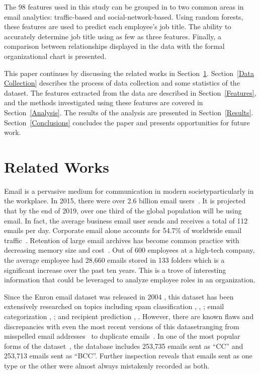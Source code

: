 \documentclass{article}
\begin{document}
The 98 features used in this study can be grouped in to two common areas in email analytics: traffic-based and social-network-based. Using random forests, these features are used to predict each employee's job title.  The ability to accurately determine job title using as few as three features.  Finally, a comparison between relationships displayed in the data with the formal organizational chart is presented.  

This paper continues by discussing the related works in Section~\ref{Related Works}.  Section~\ref{Data Collection} describes the process of data collection and some statistics of the dataset.  The features extracted from the data are described in Section~\ref{Features}, and the methods investigated using these features are covered in Section~\ref{Analysis}.  The results of the analysis are presented in Section~\ref{Results}.  Section~\ref{Conclusions} concludes the paper and presents opportunities for future work.  

\section{Related Works} \label{Related Works}

Email is a pervasive medium for communication in modern society\textemdash{}particularly in the workplace.  In 2015, there were over 2.6 billion email users~\cite{something}.  It is projected that by the end of 2019, over one third of the global population will be using email.  In fact, the average business email user sends and receives a total of 112 emails per day.  Corporate email alone accounts for 54.7\% of worldwide email traffic~\cite{radicati_emails_2015}. Retention of large email archives has become common practice with decreasing memory size and cost~\cite{fisher_revisiting_2006}.  Out of 600 employees at a high-tech company, the average employee had 28,660 emails stored in 133 folders which is a significant increase over the past ten years.  This is a trove of interesting information that could be leveraged to analyze employee roles in an organization.

Since the Enron email dataset was released in 2004 \cite{klimt_introducing_2004}, this dataset has been extensively researched on topics including spam classification \cite{martin_analyzing_2005}, \cite{gaber_e-mail_2016}, \cite{shams_classifying_2013}; email categorization \cite{he_novel_2014}, \cite{keila_structure_2005}; and recipient prediction \cite{sofershtein_predicting_2015}, \cite{hu_towards_2012}.  However, there are known flaws and discrepancies with even the most recent versions of this dataset\textemdash{}ranging from misspelled email addresses~\cite{nordbo_data_2014} to duplicate emails~\cite{waterman_big_2014}. In one of the most popular forms of the dataset~\cite{shetty_enron_2004}, the database includes 253,735 emails sent as ``CC'' and  253,713 emails sent as ``BCC''.  Further inspection reveals that emails sent as one type or the other were almost always mistakenly recorded as both.
\end{document}
